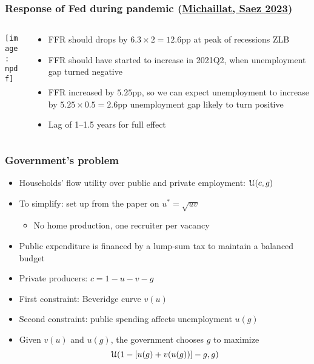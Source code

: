 \documentclass[11pt,aspectratio=169,xcolor={dvipsnames},hyperref={pdftex,pdfpagemode=UseNone,hidelinks,pdfdisplaydoctitle=true},usepdftitle=false]{beamer}
\newcommand{\npdf}{../figures/figures4.pdf}
\begin{document}
\begin{frame}
\frametitle{Response of Fed during pandemic (\href{https://pascalmichaillat.org/13/}{Michaillat, Saez 2023})}
\begin{columns}
\begin{column}{0.55\textwidth}
\texttt{[image: \\npdf]}%
\end{column}
\begin{column}{0.45\textwidth}
\begin{itemize}
	\item FFR should drops by $6.3 \times 2 = 12.6$pp at peak of recessions \then ZLB
	\item FFR should have started to increase in 2021Q2, when unemployment gap turned negative
	\item FFR increased by $5.25$pp, so we can expect unemployment to increase by $5.25\times 0.5 = 2.6$pp \then unemployment gap likely to turn positive
	\item Lag of 1–1.5 years for full effect
\end{itemize}
\end{column}  
\end{columns}
\end{frame}

\begin{frame}
\end{frame}

\begin{frame}
\frametitle{Government's problem}
\begin{itemize}
\item Households' flow utility over public and private employment: $\mathcal{U}(c,g)$
\item To simplify: set up from the paper on $u^* = \sqrt{uv}$
\begin{itemize}
\item No home production, one recruiter per vacancy 
\end{itemize}
\item Public expenditure is financed by a lump-sum tax to maintain a balanced budget
\item Private producers: $c = 1 - u - v - g$
\item First constraint: Beveridge curve $v(u)$
\item Second constraint: public spending affects unemployment $u(g)$
\item Given $v(u)$ and $u(g)$, the government chooses $g$ to maximize 
\begin{equation*}
\mathcal{U}(1 - [u(g) + v(u(g))] - g,g)
\end{equation*}
\end{itemize}
\end{frame}
\end{document}
